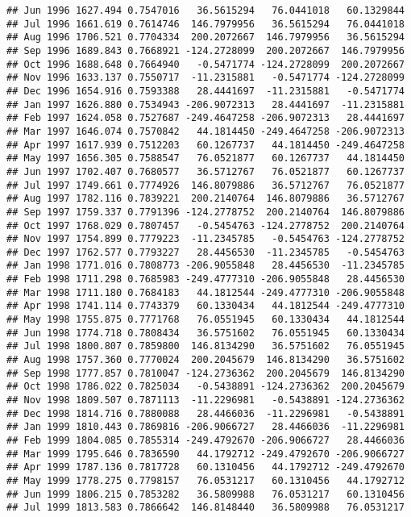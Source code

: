 \documentclass[]{article}
\begin{document}
\begin{verbatim}
## Jun 1996 1627.494 0.7547016   36.5615294   76.0441018   60.1329844
## Jul 1996 1661.619 0.7614746  146.7979956   36.5615294   76.0441018
## Aug 1996 1706.521 0.7704334  200.2072667  146.7979956   36.5615294
## Sep 1996 1689.843 0.7668921 -124.2728099  200.2072667  146.7979956
## Oct 1996 1688.648 0.7664940   -0.5471774 -124.2728099  200.2072667
## Nov 1996 1633.137 0.7550717  -11.2315881   -0.5471774 -124.2728099
## Dec 1996 1654.916 0.7593388   28.4441697  -11.2315881   -0.5471774
## Jan 1997 1626.880 0.7534943 -206.9072313   28.4441697  -11.2315881
## Feb 1997 1624.058 0.7527687 -249.4647258 -206.9072313   28.4441697
## Mar 1997 1646.074 0.7570842   44.1814450 -249.4647258 -206.9072313
## Apr 1997 1617.939 0.7512203   60.1267737   44.1814450 -249.4647258
## May 1997 1656.305 0.7588547   76.0521877   60.1267737   44.1814450
## Jun 1997 1702.407 0.7680577   36.5712767   76.0521877   60.1267737
## Jul 1997 1749.661 0.7774926  146.8079886   36.5712767   76.0521877
## Aug 1997 1782.116 0.7839221  200.2140764  146.8079886   36.5712767
## Sep 1997 1759.337 0.7791396 -124.2778752  200.2140764  146.8079886
## Oct 1997 1768.029 0.7807457   -0.5454763 -124.2778752  200.2140764
## Nov 1997 1754.899 0.7779223  -11.2345785   -0.5454763 -124.2778752
## Dec 1997 1762.577 0.7793227   28.4456530  -11.2345785   -0.5454763
## Jan 1998 1771.016 0.7808773 -206.9055848   28.4456530  -11.2345785
## Feb 1998 1711.298 0.7685983 -249.4777310 -206.9055848   28.4456530
## Mar 1998 1711.180 0.7684183   44.1812544 -249.4777310 -206.9055848
## Apr 1998 1741.114 0.7743379   60.1330434   44.1812544 -249.4777310
## May 1998 1755.875 0.7771768   76.0551945   60.1330434   44.1812544
## Jun 1998 1774.718 0.7808434   36.5751602   76.0551945   60.1330434
## Jul 1998 1800.807 0.7859800  146.8134290   36.5751602   76.0551945
## Aug 1998 1757.360 0.7770024  200.2045679  146.8134290   36.5751602
## Sep 1998 1777.857 0.7810047 -124.2736362  200.2045679  146.8134290
## Oct 1998 1786.022 0.7825034   -0.5438891 -124.2736362  200.2045679
## Nov 1998 1809.507 0.7871113  -11.2296981   -0.5438891 -124.2736362
## Dec 1998 1814.716 0.7880088   28.4466036  -11.2296981   -0.5438891
## Jan 1999 1810.443 0.7869816 -206.9066727   28.4466036  -11.2296981
## Feb 1999 1804.085 0.7855314 -249.4792670 -206.9066727   28.4466036
## Mar 1999 1795.646 0.7836590   44.1792712 -249.4792670 -206.9066727
## Apr 1999 1787.136 0.7817728   60.1310456   44.1792712 -249.4792670
## May 1999 1778.275 0.7798157   76.0531217   60.1310456   44.1792712
## Jun 1999 1806.215 0.7853282   36.5809988   76.0531217   60.1310456
## Jul 1999 1813.583 0.7866642  146.8148440   36.5809988   76.0531217

\end{verbatim}
\end{document}
